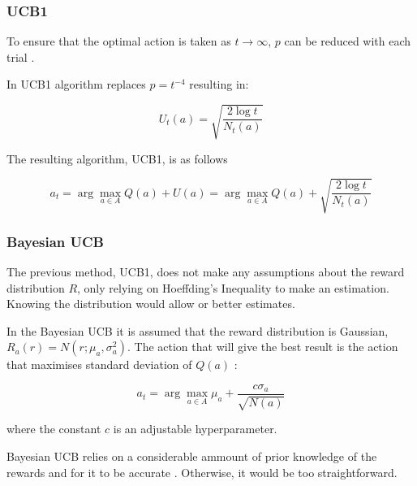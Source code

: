 \subsubsection*{UCB1}
To ensure that the optimal action is taken as $t\rightarrow\infty$, $p$ can be
reduced with each trial \cite{kn:Silver}.

In UCB1 algorithm replaces $p=t^{-4}$ resulting in:

\begin{displaymath}
    U_t(a) = \sqrt{\frac{2\log t}{N_t(a)}}
\end{displaymath}

The resulting algorithm, UCB1, is as follows

\begin{displaymath}
a_t = \arg\max_{a\in A}Q(a) + U(a) = \arg\max_{a\in A}Q(a) + \sqrt{\frac{2\log t}{N_t(a)}}
\end{displaymath}

\subsubsection*{Bayesian UCB}
\label{sota:bayesian_ucb}
The previous method, UCB1, does not make any assumptions about the reward
distribution $R$, only relying on Hoeffding's Inequality to make an estimation.
Knowing the distribution would allow or better estimates.

In the Bayesian UCB it is assumed that the reward distribution is Gaussian,
$R_a(r) = N(r;\mu_a,\sigma_a^2)$. The action that will give the best result is the
action that maximises standard deviation of $Q(a)$ \cite{kn:Silver}:

\begin{displaymath}
    a_t = \arg\max_{a\in A}\mu_a + \frac{c\sigma_a}{\sqrt{N(a)}}
\end{displaymath}

where the constant $c$ is an adjustable hyperparameter.

Bayesian UCB relies on a considerable ammount of prior knowledge of the rewards
and for it to be accurate \cite{kn:Silver}. Otherwise, it would be too
straightforward.


